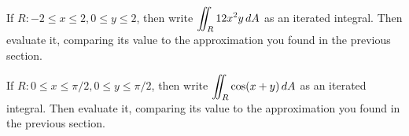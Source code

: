 \documentclass[letterpaper, twoside, 12pt]{book}
\begin{document}
          \begin{problem}
            If $R : -2\leq x\leq 2, 0\leq y\leq 2 $, then write
            $\displaystyle\iint_R 12x^2y\,d{A}$
            as an iterated integral. Then evaluate it, comparing its
            value to the approximation you found in the previous section.
          \end{problem}

          \begin{solution}

          \end{solution}

          \begin{contributors}
          \end{contributors}

          \begin{problem}
            If $R : 0\leq x\leq \pi/2, 0\leq y\leq \pi/2 $, then write
            $\displaystyle\iint_R \cos(x+y)\,d{A}$
            as an iterated integral. Then evaluate it, comparing its
            value to the approximation you found in the previous section.
          \end{problem}

          \begin{solution}

          \end{solution}

          \begin{contributors}
          \end{contributors}
\end{document}
